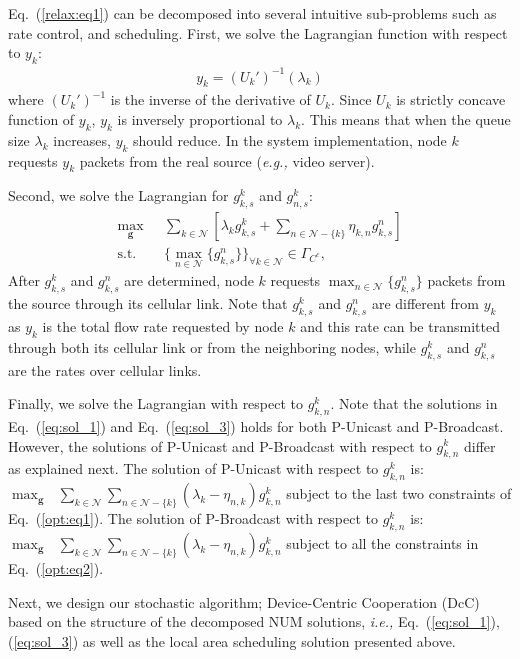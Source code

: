 \documentclass[conference]{IEEEtran}
\newcommand{\ie}{{\em i.e., }}
\newcommand{\eg}{{\em e.g., }}
\newcommand{\Nset}{\mathcal{N}}
\begin{document}
Eq.~(\ref{relax:eq1}) can be decomposed into several intuitive sub-problems such as rate control, and scheduling. First, we solve the Lagrangian function with respect to $y_k$:
\begin{align} \label{eq:sol_1}
y_k = (U_{k}')^{-1}(\lambda_{k})
\end{align} where $(U_{k}')^{-1}$ is the inverse of the derivative of  $U_k$. Since $U_k$ is strictly concave function of $y_k$, $y_k$ is inversely proportional to $\lambda_{k}$. This means that when the queue size $\lambda_{k}$ increases, $y_k$ should reduce.
In the system implementation, node $k$ requests $y_k$ packets from the real source (\eg video server).

Second, we solve the Lagrangian for $g_{k,s}^{k}$ and $g_{n,s}^{k}$:
\begin{align} \label{eq:sol_3}
\max_{\boldsymbol g} \mbox{ } & \sum_{k \in \Nset} [ \lambda_{k} g_{k,s}^{k} +  \sum_{n \in \Nset-\{k\}} \eta_{k,n}g_{k,s}^{n}]  \nonumber \\
\mbox{s.t.} \mbox{ }  & \{\max_{n \in \Nset} \{g_{k,s}^{n}\}\}_{\forall k \in \Nset} \in \Gamma_{C^c}, \mbox{ }
\end{align} After $g_{k,s}^{k} $ and $g_{k,s}^{n}$ are determined, node $k$ requests $\max_{n \in \Nset}\{g_{k,s}^{n}\}$ packets from the source through its cellular link. Note that $g_{k,s}^{k} $ and $g_{k,s}^{n}$ are different from $y_k$ as $y_k$ is the total flow rate requested by node $k$ and this rate can be transmitted through both its cellular link or from the neighboring nodes, while $g_{k,s}^{k} $ and $g_{k,s}^{n}$ are the rates over cellular links.

Finally, we solve the Lagrangian with respect to $g_{k,n}^{k}$. Note that the solutions in Eq.~(\ref{eq:sol_1}) and Eq.~(\ref{eq:sol_3}) holds for both P-Unicast and P-Broadcast. However, the solutions of P-Unicast and P-Broadcast with respect to $g_{k,n}^{k}$ differ as explained next. The solution of P-Unicast with respect to $g_{k,n}^{k}$ is: $\max_{\boldsymbol g} \mbox{ } \sum_{k \in \Nset} \sum_{n \in \Nset-\{k\}} (\lambda_{k} - \eta_{n,k})g_{k,n}^{k}$ subject to the last two constraints of Eq.~(\ref{opt:eq1}). The solution of P-Broadcast with respect to $g_{k,n}^{k}$ is: $\max_{\boldsymbol g} \mbox{ } \sum_{k \in \Nset} \sum_{n \in \Nset-\{k\}} (\lambda_{k} - \eta_{n,k}) g_{k,n}^{k}$ subject to all the constraints in Eq.~(\ref{opt:eq2}).

Next, we design our stochastic algorithm; Device-Centric Cooperation (DcC) based on the structure of the decomposed NUM solutions, \ie Eq.~(\ref{eq:sol_1}),(\ref{eq:sol_3}) as well as the local area scheduling solution presented above.
\end{document}
